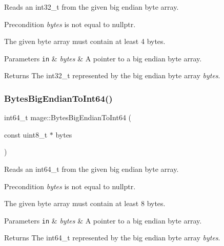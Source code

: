 Reads an int32\+\_\+t from the given big endian byte array.

\begin{DoxyPrecond}{Precondition}
{\itshape bytes} is not equal to {\ttfamily nullptr}. 

The given byte array must contain at least 4 bytes. 
\end{DoxyPrecond}

\begin{DoxyParams}[1]{Parameters}
\mbox{\tt in}  & {\em bytes} & A pointer to a big endian byte array. \\
\hline
\end{DoxyParams}
\begin{DoxyReturn}{Returns}
The {\ttfamily int32\+\_\+t} represented by the big endian byte array {\itshape bytes}. 
\end{DoxyReturn}
\hypertarget{namespacemage_acdf89224917da5c7f2f9ffe2bd8f8d25}{}\label{namespacemage_acdf89224917da5c7f2f9ffe2bd8f8d25} 
\subsubsection{\texorpdfstring{Bytes\+Big\+Endian\+To\+Int64()}{BytesBigEndianToInt64()}}
{\footnotesize\ttfamily int64\+\_\+t mage\+::\+Bytes\+Big\+Endian\+To\+Int64 (\begin{DoxyParamCaption}\item[{const uint8\+\_\+t $\ast$}]{bytes }\end{DoxyParamCaption})\hspace{0.3cm}{\ttfamily [noexcept]}}

Reads an int64\+\_\+t from the given big endian byte array.

\begin{DoxyPrecond}{Precondition}
{\itshape bytes} is not equal to {\ttfamily nullptr}. 

The given byte array must contain at least 8 bytes. 
\end{DoxyPrecond}

\begin{DoxyParams}[1]{Parameters}
\mbox{\tt in}  & {\em bytes} & A pointer to a big endian byte array. \\
\hline
\end{DoxyParams}
\begin{DoxyReturn}{Returns}
The {\ttfamily int64\+\_\+t} represented by the big endian byte array {\itshape bytes}. 
\end{DoxyReturn}
\hypertarget{namespacemage_a725fa878aaf2bf3a8be1ce2ade51d22a}{}\label{namespacemage_a725fa878aaf2bf3a8be1ce2ade51d22a} 
